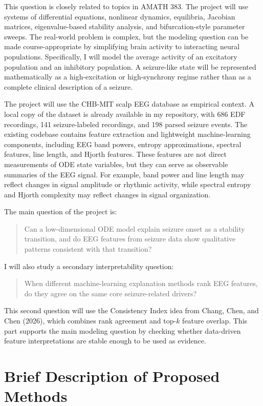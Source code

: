 \documentclass[11pt]{article}
\begin{document}
This question is closely related to topics in AMATH 383. The project will use systems of differential equations, nonlinear dynamics, equilibria, Jacobian matrices, eigenvalue-based stability analysis, and bifurcation-style parameter sweeps. The real-world problem is complex, but the modeling question can be made course-appropriate by simplifying brain activity to interacting neural populations. Specifically, I will model the average activity of an excitatory population and an inhibitory population. A seizure-like state will be represented mathematically as a high-excitation or high-synchrony regime rather than as a complete clinical description of a seizure.

The project will use the CHB-MIT scalp EEG database as empirical context. A local copy of the dataset is already available in my repository, with 686 EDF recordings, 141 seizure-labeled recordings, and 198 parsed seizure events. The existing codebase contains feature extraction and lightweight machine-learning components, including EEG band powers, entropy approximations, spectral features, line length, and Hjorth features. These features are not direct measurements of ODE state variables, but they can serve as observable summaries of the EEG signal. For example, band power and line length may reflect changes in signal amplitude or rhythmic activity, while spectral entropy and Hjorth complexity may reflect changes in signal organization.

The main question of the project is:
\begin{quote}
Can a low-dimensional ODE model explain seizure onset as a stability transition, and do EEG features from seizure data show qualitative patterns consistent with that transition?
\end{quote}

I will also study a secondary interpretability question:
\begin{quote}
When different machine-learning explanation methods rank EEG features, do they agree on the same core seizure-related drivers?
\end{quote}

This second question will use the Consistency Index idea from Chang, Chen, and Chen (2026), which combines rank agreement and top-\(k\) feature overlap. This part supports the main modeling question by checking whether data-driven feature interpretations are stable enough to be used as evidence.

\section*{Brief Description of Proposed Methods}
\end{document}

